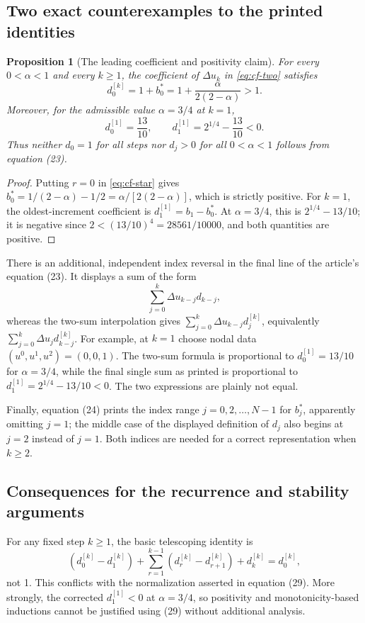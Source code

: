 \documentclass[11pt]{amsart}
\numberwithin{equation}{section}
\newtheorem{proposition}{Proposition}[section]
\theoremstyle{remark}
\begin{document}
\subsection{Two exact counterexamples to the printed identities}
\begin{proposition}[The leading coefficient and positivity claim]\label{prop:cf-counter}
For every $0<\alpha<1$ and every $k\geq1$, the coefficient of $\Delta u_{k}$
in \eqref{eq:cf-two} satisfies
\begin{equation}\label{eq:cf-leading}
d_0^{[k]}=1+b_0^*=1+\frac{\alpha}{2(2-\alpha)}>1.
\end{equation}
Moreover, for the admissible value $\alpha=3/4$ at $k=1$,
\begin{equation}\label{eq:cf-negative}
d_0^{[1]}=\frac{13}{10},\qquad d_1^{[1]}=2^{1/4}-\frac{13}{10}<0.
\end{equation}
Thus neither $d_0=1$ for all steps nor $d_j>0$ for all $0<\alpha<1$ follows
from equation (23).
\end{proposition}
\begin{proof}
Putting $r=0$ in \eqref{eq:cf-star} gives
$b_0^*=1/(2-\alpha)-1/2=\alpha/[2(2-\alpha)]$, which is strictly positive.
For $k=1$, the oldest-increment coefficient is $d_1^{[1]}=b_1-b_0^*$.
At $\alpha=3/4$, this is $2^{1/4}-13/10$; it is negative since
$2<(13/10)^4=28561/10000$, and both quantities are positive.
\end{proof}
There is an additional, independent index reversal in the final line of the
article's equation (23). It displays a sum of the form
\[
\sum_{j=0}^k\Delta u_{k-j}d_{k-j},
\]
whereas the two-sum interpolation gives
$\sum_{j=0}^k\Delta u_{k-j}d_j^{[k]}$, equivalently
$\sum_{j=0}^k\Delta u_{j}d_{k-j}^{[k]}$. For example, at $k=1$ choose nodal
data $(u^0,u^1,u^2)=(0,0,1)$. The two-sum formula is proportional to
$d_0^{[1]}=13/10$ for $\alpha=3/4$, while the final single sum as printed is
proportional to $d_1^{[1]}=2^{1/4}-13/10<0$. The two expressions are plainly
not equal.

Finally, equation (24) prints the index range $j=0,2,\ldots,N-1$ for
$b_j^*$, apparently omitting $j=1$; the middle case of the displayed
definition of $d_j$ also begins at $j=2$ instead of $j=1$. Both indices are
needed for a correct representation when $k\geq2$.

\subsection{Consequences for the recurrence and stability arguments}
For any fixed step $k\geq1$, the basic telescoping identity is
\begin{equation}\label{eq:cf-telescoping}
(d_0^{[k]}-d_1^{[k]})+\sum_{r=1}^{k-1}(d_r^{[k]}-d_{r+1}^{[k]})
+d_k^{[k]}=d_0^{[k]},
\end{equation}
not 1. This conflicts with the normalization asserted in equation (29).
More strongly, the corrected $d_1^{[1]}<0$ at $\alpha=3/4$, so positivity
and monotonicity-based inductions cannot be justified using (29) without
additional analysis.
\end{document}
